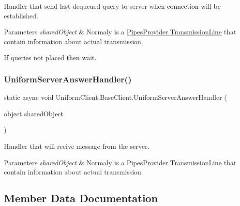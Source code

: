 Handler that send last dequeued query to server when connection will be established. 


\begin{DoxyParams}{Parameters}
{\em shared\+Object} & Normaly is a \mbox{\hyperlink{class_pipes_provider_1_1_transmission_line}{Pipes\+Provider.\+Transmission\+Line}} that contain information about actual transmission.\\
\hline
\end{DoxyParams}
If queries not placed then wait. \mbox{\label{class_uniform_client_1_1_base_client_af7a3c613846c8595431272c4c9d531f3}} 
\subsubsection{\texorpdfstring{Uniform\+Server\+Answer\+Handler()}{UniformServerAnswerHandler()}}
{\footnotesize\ttfamily static async void Uniform\+Client.\+Base\+Client.\+Uniform\+Server\+Answer\+Handler (\begin{DoxyParamCaption}\item[{object}]{shared\+Object }\end{DoxyParamCaption})\hspace{0.3cm}{\ttfamily [static]}}



Handler that will recive message from the server. 


\begin{DoxyParams}{Parameters}
{\em shared\+Object} & Normaly is a \mbox{\hyperlink{class_pipes_provider_1_1_transmission_line}{Pipes\+Provider.\+Transmission\+Line}} that contain information about actual transmission.\\
\hline
\end{DoxyParams}


\subsection{Member Data Documentation}
\mbox{\label{class_uniform_client_1_1_base_client_a1c02c6bb48c54e59c2581fe8097a4052}} 
